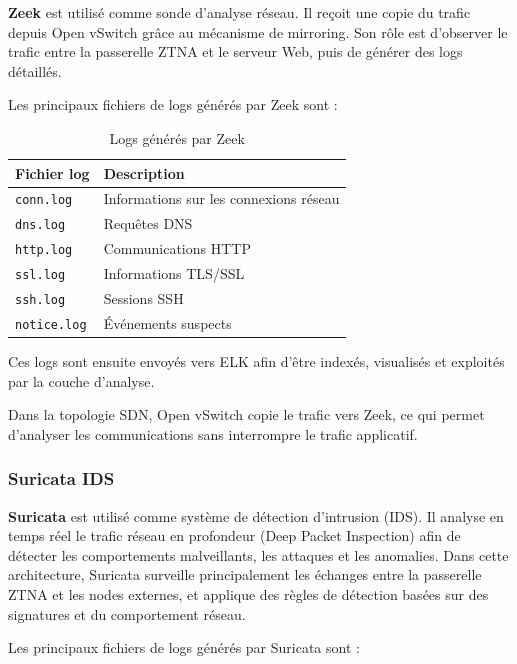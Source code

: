 \documentclass[12pt,a4paper,oneside]{report}
\begin{document}
	\textbf{Zeek} est utilisé comme sonde d'analyse réseau. Il reçoit une copie du trafic depuis Open vSwitch grâce au mécanisme de mirroring. Son rôle est d'observer le trafic entre la passerelle ZTNA et le serveur Web, puis de générer des logs détaillés.
	
	Les principaux fichiers de logs générés par Zeek sont :
	
	\begin{table}[H]
		\centering
		\renewcommand{\arraystretch}{1.2}
		\begin{tabular}{|l|p{}|}
			\hline
			\textbf{Fichier log} & \textbf{Description} \\
			\hline
			\texttt{conn.log} & Informations sur les connexions réseau \\
			\hline
			\texttt{dns.log} & Requêtes DNS \\
			\hline
			\texttt{http.log} & Communications HTTP \\
			\hline
			\texttt{ssl.log} & Informations TLS/SSL \\
			\hline
			\texttt{ssh.log} & Sessions SSH \\
			\hline
			\texttt{notice.log} & Événements suspects \\
			\hline
		\end{tabular}
		\caption{Logs générés par Zeek}
		\label{tab:logs-zeek}
	\end{table}
	
	Ces logs sont ensuite envoyés vers ELK afin d'être indexés, visualisés et exploités par la couche d'analyse.
	
	Dans la topologie SDN, Open vSwitch copie le trafic vers Zeek, ce qui permet d'analyser les communications sans interrompre le trafic applicatif.
	\subsubsection{Suricata IDS}
	
	\textbf{Suricata} est utilisé comme système de détection d’intrusion (IDS). Il analyse en temps réel le trafic réseau en profondeur (Deep Packet Inspection) afin de détecter les comportements malveillants, les attaques et les anomalies.
	Dans cette architecture, Suricata surveille principalement les échanges entre la passerelle ZTNA et les nodes externes, et applique des règles de détection basées sur des signatures et du comportement réseau.
	
	Les principaux fichiers de logs générés par Suricata sont :
	
\end{document}
